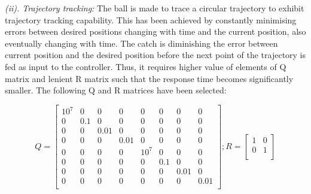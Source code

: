 \documentclass[conference]{IEEEtran}
\begin{document}
\emph{(ii). Trajectory tracking:} The ball is made to trace a circular trajectory to exhibit trajectory tracking capability. This has been achieved by constantly minimising errors between desired positions changing with time and the current position, also eventually changing with time. The catch is diminishing the error between current position and the desired position before the next point of the trajectory is fed as input to the controller. Thus, it requires higher value of elements of Q matrix and lenient R matrix such that the response time becomes significantly smaller. The following Q and R matrices have been selected:

\footnotesize
\begin{equation}
Q = \begin{bmatrix}
10^7 & 0 & 0 & 0 & 0 & 0 & 0 & 0 \\
0 & 0.1 & 0 & 0 & 0 & 0 & 0 & 0 \\
0 & 0 & 0.01 & 0 & 0 & 0 & 0 & 0 \\
0 & 0 & 0 & 0.01 & 0 & 0 & 0 & 0 \\
0 & 0 & 0 & 0 & 10^7 & 0 & 0 & 0 \\
0 & 0 & 0 & 0 & 0 & 0.1 & 0 & 0 \\
0 & 0 & 0 & 0 & 0 & 0 & 0.01 & 0 \\
0 & 0 & 0 & 0 & 0 & 0 & 0 & 0.01 \\
\end{bmatrix} ; 
R = \begin{bmatrix}
1& 0 \\
0 & 1 \\
\end{bmatrix}\label{eq27}
\end{equation}
\normalsize
\end{document}
